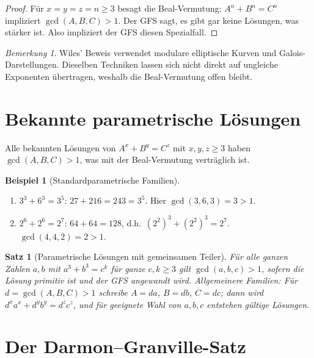 \documentclass[12pt,a4paper]{amsart}
\newtheorem{satz}[theorem]{Satz}
\theoremstyle{definition}
\newtheorem{beispiel}[theorem]{Beispiel}
\theoremstyle{remark}
\newtheorem{bemerkung}[theorem]{Bemerkung}
\begin{document}
\begin{proof}
Für $x = y = z = n \geq 3$ besagt die Beal-Vermutung: $A^n + B^n = C^n$ impliziert
$\gcd(A,B,C) > 1$. Der GFS sagt, es gibt gar keine Lösungen, was stärker ist.
Also impliziert der GFS diesen Spezialfall.
\end{proof}

\begin{bemerkung}
Wiles' Beweis verwendet modulare elliptische Kurven und Galois-Darstellungen.
Dieselben Techniken lassen sich nicht direkt auf ungleiche Exponenten übertragen,
weshalb die Beal-Vermutung offen bleibt.
\end{bemerkung}

\section{Bekannte parametrische Lösungen}

Alle bekannten Lösungen von $A^x + B^y = C^z$ mit $x, y, z \geq 3$ haben
$\gcd(A,B,C) > 1$, was mit der Beal-Vermutung verträglich ist.

\begin{beispiel}[Standardparametrische Familien]\label{bsp:param}
\begin{enumerate}[label=(\alph*)]
  \item $3^3 + 6^3 = 3^5$: $27 + 216 = 243 = 3^5$. Hier $\gcd(3,6,3) = 3 > 1$.
  \item $2^6 + 2^6 = 2^7$: $64 + 64 = 128$, d.h.\ $(2^2)^3 + (2^2)^3 = 2^7$.
        $\gcd(4,4,2) = 2 > 1$.
\end{enumerate}
\end{beispiel}

\begin{satz}[Parametrische Lösungen mit gemeinsamen Teiler]\label{satz:param}
Für alle ganzen Zahlen $a, b$ mit $a^3 + b^3 = c^k$ für ganze $c, k \geq 3$
gilt $\gcd(a,b,c) > 1$, sofern die Lösung primitiv ist und der GFS angewandt wird.
Allgemeinere Familien: Für $d = \gcd(A,B,C) > 1$ schreibe $A = da$, $B = db$,
$C = dc$; dann wird $d^x a^x + d^y b^y = d^z c^z$, und für geeignete Wahl von
$a,b,c$ entstehen gültige Lösungen.
\end{satz}

\section{Der Darmon--Granville-Satz}
\end{document}
